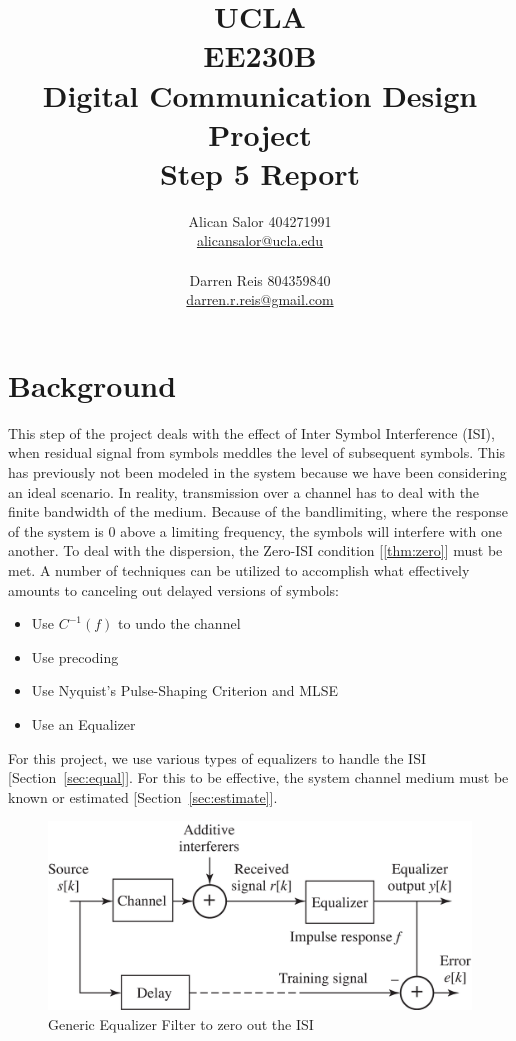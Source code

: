 \documentclass[]{article}
\title{UCLA\\EE230B\\Digital Communication Design Project\\Step 5 Report}
\author{Alican Salor 404271991 \\  \href{mailto:alicansalor@ucla.edu}{alicansalor@ucla.edu} \\ \\
Darren Reis 804359840 \\
\href{mailto:darrer.r.reis@gmail.com}{darren.r.reis@gmail.com} }
\begin{document}
\maketitle

\newpage
\tableofcontents

\newpage
\section{Background}
\label{sec:background}
This step of the project deals with the effect of Inter Symbol Interference (ISI), when residual signal from symbols meddles the level of subsequent symbols.  This has previously not been modeled in the system because we have been considering an ideal scenario.  In reality, transmission over a channel has to deal with the finite bandwidth of the medium.  Because of the bandlimiting, where the response of the system is 0 above a limiting frequency, the symbols will interfere with one another. To deal with the dispersion, the Zero-ISI condition [\ref{thm:zero}] must be met.  A number of techniques can be utilized to accomplish what effectively amounts to canceling out delayed versions of symbols:

\begin{itemize}
\item Use $C^{-1}\left(f\right)$ to undo the channel
\item Use precoding
\item Use Nyquist's Pulse-Shaping Criterion and MLSE
\item Use an Equalizer
\end{itemize}
For this project, we use various types of equalizers to handle the ISI [Section~\ref{sec:equal}].  For this to be effective, the system channel medium must be known or estimated [Section~\ref{sec:estimate}].\\

\begin{figure}[b]
\centering
\includegraphics[width=.6\textwidth]{equalizer.png}
\caption{Generic Equalizer Filter to zero out the ISI\label{fig:equalizer}}
\end{figure}
\end{document}
